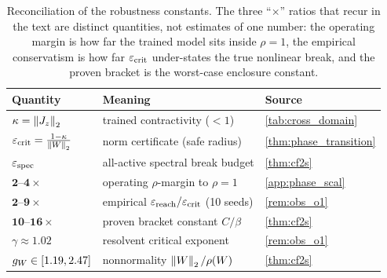 \begin{table}[t]\centering\footnotesize\setlength{\tabcolsep}{1pt}
\caption{Reconciliation of the robustness constants. The three ``$\times$'' ratios that recur in the
text are distinct quantities, not estimates of one number: the operating margin is how far the trained
model sits inside $\rho=1$, the empirical conservatism is how far $\varepsilon_{\mathrm{crit}}$ under-states the true
nonlinear break, and the proven bracket is the worst-case enclosure constant.}
\label{tab:constants}
\begin{tabular}{@{}lll@{}}
\toprule
Quantity & Meaning & Source \\
\midrule
$\kappa=\left\|J_z\right\|_2$ & trained contractivity ($<1$) & \cref{tab:cross_domain} \\
$\varepsilon_{\mathrm{crit}}=\tfrac{1-\kappa}{\left\|W\right\|_2}$ & norm certificate (safe radius) & \cref{thm:phase_transition} \\
$\varepsilon_{\mathrm{spec}}$ & all-active spectral break budget & \cref{thm:cf2s} \\
$\mathbf{2}$--$\mathbf{4\times}$ & operating $\rho$-margin to $\rho=1$ & \cref{app:phase_scal} \\
$\mathbf{2}$--$\mathbf{9\times}$ & empirical $\varepsilon_{\mathrm{reach}}/\varepsilon_{\mathrm{crit}}$ (10 seeds) & \cref{rem:obs_o1} \\
$\mathbf{10}$--$\mathbf{16\times}$ & proven bracket constant $C/\beta$ & \cref{thm:cf2s} \\
$\gamma\approx1.02$ & resolvent critical exponent & \cref{rem:obs_o1} \\
$g_W\in[1.19,2.47]$ & nonnormality $\left\|W\right\|_2/\rho(W)$ & \cref{thm:cf2s} \\
\bottomrule
\end{tabular}
\end{table}
